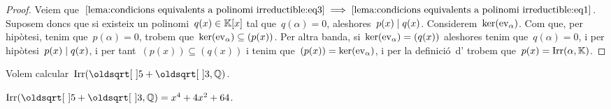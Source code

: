 \documentclass[../../main.tex]{subfiles}
\begin{document}
\begin{proof}
        Veiem que~\(\eqref{lema:condicions equivalents a polinomi irreductible:eq3}\implies\eqref{lema:condicions equivalents a polinomi irreductible:eq1}\).
        Suposem doncs que si existeix un polinomi~\(q(x)\in\mathbb{K}[x]\) tal que~\(q(\alpha)=0\), aleshores~\(p(x)\mathrel{|} q(x)\).
        Considerem~\(\operatorname{ker}(\mathrm{ev}_{\alpha})\).
        Com que, per hipòtesi, tenim que~\(p(\alpha)=0\), trobem que~\(\operatorname{ker}(\mathrm{ev}_{\alpha})\subseteq(p(x))\).
        Per altra banda, si~\(\operatorname{ker}(\mathrm{ev}_{\alpha})=(q(x))\) aleshores tenim que~\(q(\alpha)=0\), i per hipòtesi~\(p(x)\mathrel{|} q(x)\), i per tant~\((p(x))\subseteq(q(x))\) i tenim que~\((p(x))=\operatorname{ker}(\mathrm{ev}_{\alpha})\), i per la definició~d' trobem que~\(p(x)=\operatorname{Irr}(\alpha,\mathbb{K})\).
    \end{proof}
    \begin{example}
        Volem calcular~\(\Irr(\sqrt{5}+\sqrt{3},\QQ)\).
    \end{example}
    \begin{solution}
        \(\Irr(\sqrt{5}+\sqrt{3},\QQ)=x^{4}+4x^{2}+64\).
    \end{solution}
\end{document}
